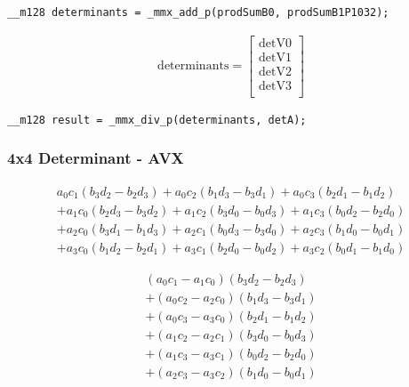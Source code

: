 \documentclass[fontsize = 10pt,DIV = 13]{scrartcl}
\newcommand{\pth}[1]{\left(#1\right)}
\begin{document}
\begin{verbatim}
__m128 determinants = _mmx_add_p(prodSumB0, prodSumB1P1032);
\end{verbatim}


\begin{align*}
\mathrm{determinants} 
=
\begin{bmatrix}
\mathrm{detV0}\\
\mathrm{detV1}\\
\mathrm{detV2}\\
\mathrm{detV3}\\
\end{bmatrix}
\end{align*}

\begin{verbatim}
__m128 result = _mmx_div_p(determinants, detA);
\end{verbatim}


\subsubsection{4x4 Determinant - AVX}
\label{sec:determinant4x4AVX}

\begin{align*}
  a_0c_1 \pth{b_3d_2 - b_2d_3}
+ a_0c_2 \pth{b_1d_3 - b_3d_1}            
+ a_0c_3 \pth{b_2d_1 - b_1d_2}\\
+ a_1c_0 \pth{b_2d_3 - b_3d_2}
+ a_1c_2 \pth{b_3d_0 - b_0d_3}
+ a_1c_3 \pth{b_0d_2 - b_2d_0}\\
+ a_2c_0 \pth{b_3d_1 - b_1d_3}
+ a_2c_1 \pth{b_0d_3 - b_3d_0}
+ a_2c_3 \pth{b_1d_0 - b_0d_1}\\
+ a_3c_0 \pth{b_1d_2 - b_2d_1}
+ a_3c_1 \pth{b_2d_0 - b_0d_2}
+ a_3c_2 \pth{b_0d_1 - b_1d_0}
\end{align*}

\begin{align*}
  \pth{a_0c_1 - a_1c_0} \pth{b_3d_2 - b_2d_3} \\
+ \pth{a_0c_2 - a_2c_0} \pth{b_1d_3 - b_3d_1} \\
+ \pth{a_0c_3 - a_3c_0} \pth{b_2d_1 - b_1d_2} \\
+ \pth{a_1c_2 - a_2c_1} \pth{b_3d_0 - b_0d_3} \\
+ \pth{a_1c_3 - a_3c_1} \pth{b_0d_2 - b_2d_0} \\ 
+ \pth{a_2c_3 - a_3c_2} \pth{b_1d_0 - b_0d_1} \\ 
\end{align*}
\end{document}
